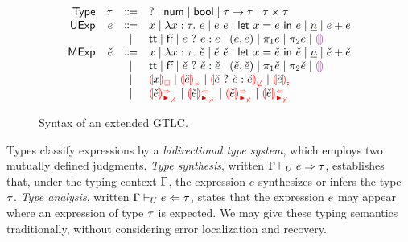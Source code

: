 \begin{figure}[htbp]
  \[\begin{array}{rrcl}
    \TMName  & \TMV  & \Coloneqq & \TUnknown \mid \TNum \mid \TBool \mid \TArrow{\TMV}{\TMV} \mid \TProd{\TMV}{\TMV} \\
    \EMName  & \EMV  & \Coloneqq & x \mid \ELam{x}{\TMV}{\EMV} \mid \EAp{\EMV}{\EMV} \mid \ELet{x}{\EMV}{\EMV}
                       \mid           \ENumMV \mid \EPlus{\EMV}{\EMV} \\
             &       & \mid         & \ETrue \mid \EFalse \mid \EIf{\EMV}{\EMV}{\EMV}
                       \mid           \EPair{\EMV}{\EMV}
                       \mid           \EProjL{\EMV} \mid \EProjR{\EMV}
                       \mid           \EEHole \\
    \ECMName & \ECMV & \Coloneqq & x \mid \ECLam{x}{\TMV}{\ECMV} \mid \ECAp{\ECMV}{\ECMV} \mid \ECLet{x}{\ECMV}{\ECMV}
                       \mid           \ECNumMV \mid \ECPlus{\ECMV}{\ECMV} \\
             &       & \mid         & \ECTrue \mid \ECFalse \mid \ECIf{\ECMV}{\ECMV}{\ECMV}
                       \mid           \ECPair{\ECMV}{\ECMV} \mid \ECProjL{\ECMV} \mid \ECProjR{\ECMV}
                       \mid           \ECEHole \\
             &       & \mid         & \ECUnbound{x} \mid \ECInconType{\ECMV} \mid \ECInconBr{\ECMV}{\ECMV}{\ECMV} \mid \ECInconAsc{\ECMV} \\
             &       & \mid         & \ECSynNonMatchedArrow{\ECMV} \mid \ECAnaNonMatchedArrow{\ECMV}
                       \mid           \ECSynNonMatchedProd{\ECMV} \mid \ECAnaNonMatchedProd{\ECMV}
  \end{array}\]
  \caption{Syntax of an extended GTLC.}
  \label{fig:calculus-syntax}
\end{figure}

Types classify expressions by a \emph{bidirectional type system}, which employs two mutually defined
judgments. \emph{Type synthesis}, written $\Gamma \vdash_{U} e \Rightarrow \tau$, establishes that, under
the typing context $\Gamma$, the expression $e$ synthesizes or infers the type $\tau$. \emph{Type
analysis}, written $\Gamma \vdash_{U} e \Leftarrow \tau$, states that the expression $e$ may appear
where an expression of type $\tau$ is expected. We may give these typing semantics traditionally,
without considering error localization and recovery.

